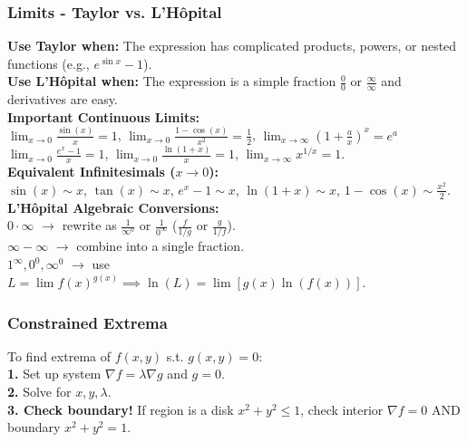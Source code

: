 \subsubsection{Limits - Taylor vs. L'Hôpital}
\textbf{Use Taylor when:} The expression has complicated products, powers, or nested functions (e.g., $e^{\sin x} - 1$). \\
\textbf{Use L'Hôpital when:} The expression is a simple fraction $\frac{0}{0}$ or $\frac{\infty}{\infty}$ and derivatives are easy. \\
\textbf{Important Continuous Limits:} \\
$\lim_{x \to 0} \frac{\sin(x)}{x} = 1$, $\lim_{x \to 0} \frac{1-\cos(x)}{x^2} = \frac{1}{2}$, $\lim_{x \to \infty} \left(1+\frac{a}{x}\right)^x = e^a$ \\
$\lim_{x \to 0} \frac{e^x-1}{x} = 1$, $\lim_{x \to 0} \frac{\ln(1+x)}{x} = 1$, $\lim_{x \to \infty} x^{1/x} = 1$. \\
\textbf{Equivalent Infinitesimals ($x \to 0$):} \\
$\sin(x) \sim x$, $\tan(x) \sim x$, $e^x - 1 \sim x$, $\ln(1+x) \sim x$, $1 - \cos(x) \sim \frac{x^2}{2}$. \\
\textbf{L'Hôpital Algebraic Conversions:} \\
\textbf{$0 \cdot \infty$} $\to$ rewrite as $\frac{1}{\infty^0}$ or $\frac{1}{0^\infty}$ ($\frac{f}{1/g}$ or $\frac{g}{1/f}$). \\
\textbf{$\infty - \infty$} $\to$ combine into a single fraction. \\
\textbf{$1^\infty, 0^0, \infty^0$} $\to$ use $L = \lim f(x)^{g(x)} \implies \ln(L) = \lim [g(x)\ln(f(x))]$.

\subsubsection{Constrained Extrema}
To find extrema of $f(x,y)$ s.t. $g(x,y)=0$: \\
\textbf{1.} Set up system $\nabla f = \lambda \nabla g$ and $g = 0$. \\
\textbf{2.} Solve for $x, y, \lambda$. \\
\textbf{3. Check boundary!} If region is a disk $x^2+y^2 \le 1$, check interior $\nabla f = 0$ AND boundary $x^2+y^2=1$.
